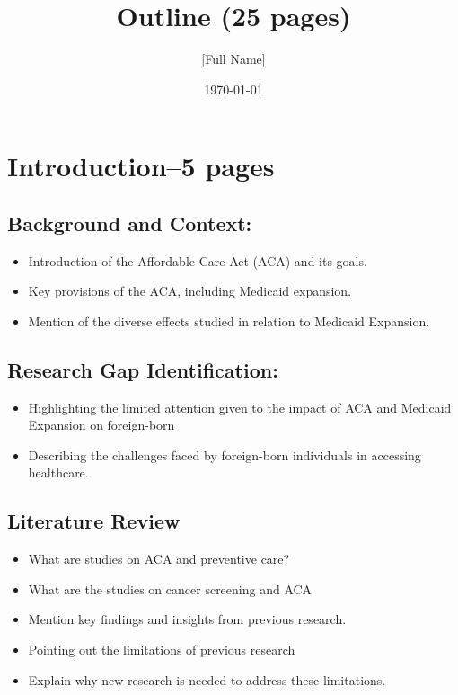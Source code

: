 \documentclass[10pt, oneside]{article}
\title{Outline (25 pages)}
\author{[Full Name]}
\date{\today}
\begin{document}
\maketitle

\vspace{.25in}

\section{Introduction--5 pages}
\subsection {Background and Context:}
\begin{itemize}
\item Introduction of the Affordable Care Act (ACA) and its goals.
\item Key provisions of the ACA, including Medicaid expansion.
\item Mention of the diverse effects studied in relation to Medicaid Expansion.
\end{itemize}


\subsection{Research Gap Identification:}
\begin{itemize}
\item Highlighting the limited attention given to the impact of ACA and Medicaid Expansion on foreign-born 
\item Describing the challenges faced by foreign-born individuals in accessing healthcare.
\end{itemize}



\subsection{Literature Review}


\begin{itemize}
\item What are studies on ACA and preventive care? 
\item What are the studies on cancer screening and ACA
\item Mention key findings and insights from previous research.
\item Pointing out the limitations of previous research
\item Explain why new research is needed to address these limitations.
\end{itemize}
\end{document}
